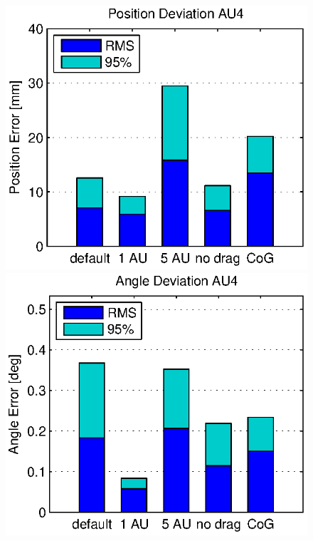 \begin{figure}[hbtp]
\captionsetup{width=0.9\textwidth}
\centering
\includegraphics[scale=.72]{images/results/err_cmp_sim_pos.eps}
\includegraphics[scale=.72]{images/results/err_cmp_sim_angle.eps}

\end{figure}

